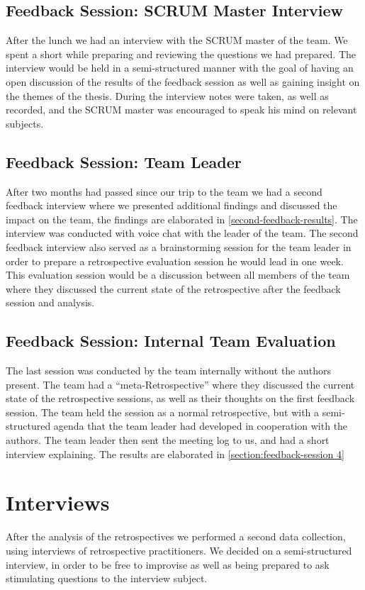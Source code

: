 \subsection{Feedback Session: SCRUM Master Interview}
After the lunch we had an interview with the SCRUM master of the team. We spent a short while preparing and reviewing the questions we had prepared. The interview would be held in a semi-structured manner with the goal of having an open discussion of the results of the feedback session as well as gaining insight on the themes of the thesis. During the interview notes were taken, as well as recorded, and the SCRUM master was encouraged to speak his mind on relevant subjects. 

\subsection{Feedback Session: Team Leader}
After two months had passed since our trip to the team we had a second feedback interview where we presented additional findings and discussed the impact on the team, the findings are elaborated in  \autoref{second-feedback-results}. The interview was conducted with voice chat with the leader of the team. The second feedback interview also served as a brainstorming session for the team leader in order to prepare a retrospective evaluation session he would lead in one week. This evaluation session would be a discussion between all members of the team where they discussed the current state of the retrospective after the feedback session and analysis.

\subsection{Feedback Session: Internal Team Evaluation}
The last session was conducted by the team internally without the authors present. The team had a ``meta-Retrospective'' where they discussed the current state of the retrospective sessions, as well as their thoughts on the first feedback session. The team held the session as a normal retrospective, but with a semi-structured agenda that the team leader had developed in cooperation with the authors. The team leader then sent the meeting log to us, and had a short interview explaining. The results are elaborated in \autoref{section:feedback-session 4}


\section{Interviews}	
After the analysis of the retrospectives we performed a second data collection, using interviews of retrospective practitioners. We decided on a semi-structured interview, in order to be free to improvise as well as being prepared to ask stimulating questions to the interview subject.

